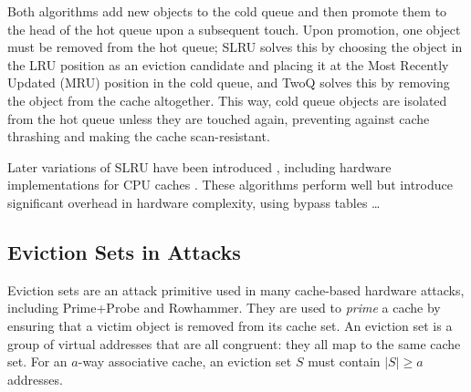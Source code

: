 \documentclass[sigconf, screen, review]{acmart}
\begin{document}
Both algorithms add new objects to the cold queue
and then promote them to the head of the hot queue upon a subsequent touch.
Upon promotion, one object must be removed from the hot queue;
SLRU solves this by choosing the object in the LRU position as an eviction candidate
and placing it at the Most Recently Updated (MRU) position in the cold queue,
and TwoQ solves this by removing the object from the cache altogether.
This way, cold queue objects are isolated from the hot queue unless they are touched again,
preventing against cache thrashing and making the cache scan-resistant.

Later variations of SLRU have been introduced \cite{SSLRU},
including hardware implementations for CPU caches
\cite{DuelingSLRU}\cite{LimitedSLRU}\cite{FixedSLRU}\cite{FixedSLRUEnhancements}.
These algorithms perform well but introduce significant overhead in hardware complexity,
using bypass tables \dots



\subsection{Eviction Sets in Attacks}

Eviction sets are an attack primitive used in many cache-based hardware attacks,
including Prime+Probe and Rowhammer.
They are used to \textit{prime} a cache by ensuring that a victim object is removed from its cache set.
An eviction set is a group of virtual addresses that are all congruent: they all map to the same cache set.
For an $a$-way associative cache, an eviction set $S$ must contain $|S| \geq a$ addresses.
\end{document}
